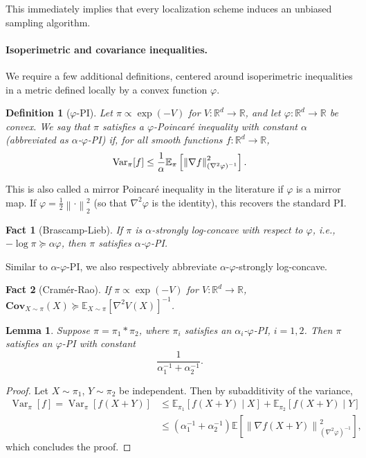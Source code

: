 \documentclass[11pt]{article}
\newtheorem{lemma}{Lemma}
\newtheorem{fact}{Fact}
\newtheorem{definition}{Definition}
\newcommand{\norm}[1]{\left\lVert#1\right\rVert}
\newcommand{\R}{\mathbb{R}}
\newcommand{\half}{\frac{1}{2}}
\newcommand{\E}{\mathbb{E}}
\newcommand{\Var}{\textup{Var}}
\newcommand{\Brack}[1]{\left[#1\right]}
\newcommand{\Cov}{\mathbf{Cov}}
\newcommand{\0}{\mathbf{0}}
\newcommand{\1}{\mathbf{1}}
\newcommand{\vhi}{\varphi}
\begin{document}
This immediately implies that every localization scheme induces an unbiased sampling algorithm. 



\paragraph{Isoperimetric and covariance inequalities.} We require a few additional definitions, centered around isoperimetric inequalities in a metric defined locally by a convex function $\vhi$.


\begin{definition}[$\vhi$-PI]\label{def:vpi}
Let $\pi \propto \exp(-V)$ for $V: \R^d \to \R$, and let $\vhi: \R^d \to \R$ be convex. We say that $\pi$ satisfies a $\vhi$-Poincar\'e inequality with constant $\alpha$ (abbreviated as $\alpha$-$\vhi$-PI) if, for all smooth functions $f: \R^d \to \R$,
\[\Var_{\pi}[f] \le \frac 1 \alpha \E_\pi\Brack{\norm{\nabla f}_{(\nabla^2 \vhi)^{-1}}^2}.\]
\end{definition}
This is also called a mirror Poincar\'e inequality in the literature if $\vhi$ is a mirror map. If $\vhi = \half\norm{\cdot}_2^2$ (so that $\nabla^2 \vhi$ is the identity), this recovers the standard PI.

\begin{fact}[Brascamp-Lieb]\label{fact:brascamp_lieb}
    If $\pi$ is $\alpha$-strongly log-concave with respect to $\vhi$, i.e., $-\log \pi\succeq \alpha \vhi$, then $\pi$ satisfies $\alpha$-$\vhi$-PI.
\end{fact}
Similar to $\alpha$-$\vhi$-PI, we also respectively abbreviate $\alpha$-$\vhi$-strongly log-concave.

\begin{fact}[Cram\'er-Rao]\label{fact:cramer_rao}
If $\pi \propto \exp(-V)$ for $V: \R^d \to \R$,    $\Cov_{X\sim \pi}(X) \succeq\E_{X\sim \pi}[\nabla^2V(X)]^{-1}$.
\end{fact} 

\begin{lemma}\label{lem:poincare-conv}
    Suppose $\pi=\pi_1*\pi_2$, where $\pi_i$ satisfies an $\alpha_i$-$\varphi$-PI, $i=1, 2$.  Then $\pi$ satisfies an $\varphi$-PI with constant 
    \[\frac{1}{\alpha_1^{-1}+\alpha_2^{-1}}.\]
\end{lemma}
\begin{proof}
    Let $X\sim \pi_1$, $Y\sim \pi_2$ be independent.  Then by subadditivity of the variance,
    \begin{align*}
        \operatorname{Var}_\pi[f]=\operatorname{Var}_{\pi} [f(X+Y)]
        &\le\mathbb{E}_{\pi_1}[f(X+Y)\mid X]+\mathbb{E}_{\pi_2}[f(X+Y)\mid Y]\\
        &\leq (\alpha_1^{-1}+\alpha_2^{-1})\mathbb{E}\Brack{\norm{\nabla f(X+Y)}^2_{(\nabla^2\vhi)^{-1}}},
    \end{align*}
    which concludes the proof.
\end{proof}
\end{document}

